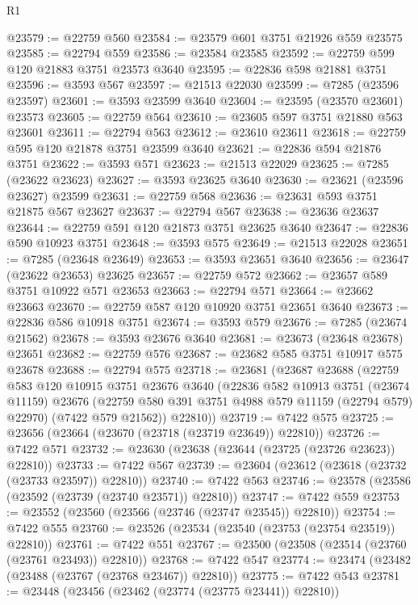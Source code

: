 \begin{lexlean}{R1}
\begin{coremodule}
@23579 := @22759 @560
@23584 := @23579 @601 @3751 @21926 @559 @23575
@23585 := @22794 @559
@23586 := @23584 @23585
@23592 := @22759 @599 @120 @21883 @3751 @23573 @3640
@23595 := @22836 @598 @21881 @3751
@23596 := @3593 @567
@23597 := @21513 @22030
@23599 := @7285 (@23596 @23597)
@23601 := @3593 @23599 @3640
@23604 := @23595 (@23570 @23601) @23573
@23605 := @22759 @564
@23610 := @23605 @597 @3751 @21880 @563 @23601
@23611 := @22794 @563
@23612 := @23610 @23611
@23618 := @22759 @595 @120 @21878 @3751 @23599 @3640
@23621 := @22836 @594 @21876 @3751
@23622 := @3593 @571
@23623 := @21513 @22029
@23625 := @7285 (@23622 @23623)
@23627 := @3593 @23625 @3640
@23630 := @23621 (@23596 @23627) @23599
@23631 := @22759 @568
@23636 := @23631 @593 @3751 @21875 @567 @23627
@23637 := @22794 @567
@23638 := @23636 @23637
@23644 := @22759 @591 @120 @21873 @3751 @23625 @3640
@23647 := @22836 @590 @10923 @3751
@23648 := @3593 @575
@23649 := @21513 @22028
@23651 := @7285 (@23648 @23649)
@23653 := @3593 @23651 @3640
@23656 := @23647 (@23622 @23653) @23625
@23657 := @22759 @572
@23662 := @23657 @589 @3751 @10922 @571 @23653
@23663 := @22794 @571
@23664 := @23662 @23663
@23670 := @22759 @587 @120 @10920 @3751 @23651 @3640
@23673 := @22836 @586 @10918 @3751
@23674 := @3593 @579
@23676 := @7285 (@23674 @21562)
@23678 := @3593 @23676 @3640
@23681 := @23673 (@23648 @23678) @23651
@23682 := @22759 @576
@23687 := @23682 @585 @3751 @10917 @575 @23678
@23688 := @22794 @575
@23718 := @23681
    (@23687
      @23688
      (@22759
        @583
        @120
        @10915
        @3751
        @23676
        @3640
        (@22836
          @582
          @10913
          @3751
          (@23674 @11159)
          @23676
          (@22759 @580 @391 @3751 @4988 @579 @11159 (@22794 @579) @22970)
          (@7422 @579 @21562))
        @22810))
@23719 := @7422 @575
@23725 := @23656 (@23664 (@23670 (@23718 (@23719 @23649)) @22810))
@23726 := @7422 @571
@23732 := @23630 (@23638 (@23644 (@23725 (@23726 @23623)) @22810))
@23733 := @7422 @567
@23739 := @23604 (@23612 (@23618 (@23732 (@23733 @23597)) @22810))
@23740 := @7422 @563
@23746 := @23578 (@23586 (@23592 (@23739 (@23740 @23571)) @22810))
@23747 := @7422 @559
@23753 := @23552 (@23560 (@23566 (@23746 (@23747 @23545)) @22810))
@23754 := @7422 @555
@23760 := @23526 (@23534 (@23540 (@23753 (@23754 @23519)) @22810))
@23761 := @7422 @551
@23767 := @23500 (@23508 (@23514 (@23760 (@23761 @23493)) @22810))
@23768 := @7422 @547
@23774 := @23474 (@23482 (@23488 (@23767 (@23768 @23467)) @22810))
@23775 := @7422 @543
@23781 := @23448 (@23456 (@23462 (@23774 (@23775 @23441)) @22810))

\end{coremodule}
\end{lexlean}
